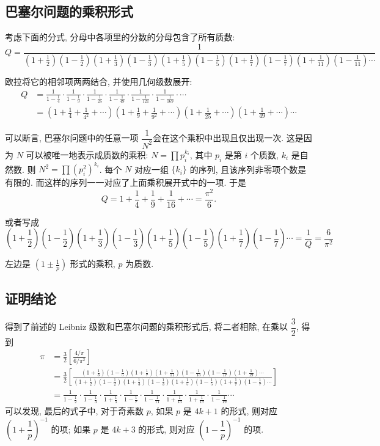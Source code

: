\subsection{巴塞尔问题的乘积形式}
考虑下面的分式, 分母中各项里的分数的分母包含了所有质数:
\[
Q = \frac{1}{(1+\frac{1}{2})(1-\frac{1}{2})(1+\frac{1}{3})(1-\frac{1}{3})(1+\frac{1}{5})(1-\frac{1}{5})(1+\frac{1}{7})(1-\frac{1}{7})(1+\frac{1}{11})(1-\frac{1}{11})\cdots}
\]

欧拉将它的相邻项两两结合, 并使用几何级数展开:
\begin{align*}
Q &= \frac{1}{1-\frac{1}{4}}\cdot\frac{1}{1-\frac{1}{9}}\cdot\frac{1}{1-\frac{1}{25}}\cdot\frac{1}{1-\frac{1}{49}}\cdot\frac{1}{1-\frac{1}{121}}\cdot\frac{1}{1-\frac{1}{169}}\cdot\cdots \\
 &= \left(1+\frac{1}{4}+\frac{1}{4^2}+\cdots\right)\left(1+\frac{1}{9}+\frac{1}{9^2}+\cdots\right)\left(1+\frac{1}{25}+\cdots\right)\left(1+\frac{1}{49}+\cdots\right)\cdots
\end{align*}

可以断言, 巴塞尔问题中的任意一项 $ \dfrac{1}{N^2}$会在这个乘积中出现且仅出现一次. 这是因为 $ N $ 可以被唯一地表示成质数的乘积: $ N = \prod p_i^{k_i} $, 其中 $ p_i $ 是第 $ i $ 个质数, $ k_i $ 是自然数.
则 $ N^2 = \prod (p_i^2)^{k_i} $. 每个 $ N $ 对应一组 $\{k_i\}$ 的序列, 且该序列非零项个数是有限的. 而这样的序列一一对应了上面乘积展开式中的一项. 于是
\[Q = 1 + \frac{1}{4} + \frac{1}{9} + \frac{1}{16} + \cdots = \frac{\pi^2}{6} .\]

或者写成
\[(1+\frac{1}{2})(1-\frac{1}{2})(1+\frac{1}{3})(1-\frac{1}{3})(1+\frac{1}{5})(1-\frac{1}{5})(1+\frac{1}{7})(1-\frac{1}{7})\cdots= \frac{1}{Q} = \frac{6}{\pi^2}\]

左边是 $(1\pm\frac{1}{p})$ 形式的乘积, $p$ 为质数.

\subsection{证明结论}

得到了前述的 Leibniz 级数和巴塞尔问题的乘积形式后, 将二者相除, 在乘以 $ \dfrac{3}{2} $, 得到
\begin{align*}
 \pi &= \frac{3}{2}\left[\frac{4/\pi}{6/\pi^2}\right] \\
&=  \frac{3}{2}\left[\frac{(1+\frac{1}{3})(1-\frac{1}{5})(1+\frac{1}{7})(1+\frac{1}{11})(1-\frac{1}{13})(1-\frac{1}{17})(1+\frac{1}{19})\cdots}{(1+\frac{1}{2})(1-\frac{1}{2})(1+\frac{1}{3})(1-\frac{1}{3})(1+\frac{1}{5})(1-\frac{1}{5})(1+\frac{1}{7})(1-\frac{1}{7})\cdots}\right] \\
&= \frac{1}{1-\frac{1}{2}}\cdot\frac{1}{1-\frac{1}{3}}\cdot\frac{1}{1+\frac{1}{5}}\cdot\frac{1}{1-\frac{1}{7}}\cdot\frac{1}{1-\frac{1}{11}}\cdot\frac{1}{1+\frac{1}{13}}\cdot\frac{1}{1+\frac{1}{17}}\cdot\frac{1}{1-\frac{1}{19}}\cdots
\end{align*}
可以发现, 最后的式子中, 对于奇素数 $ p $, 如果 $p$ 是 $4k+1$ 的形式, 则对应 $\left(1+\dfrac{1}{p}\right)^{-1}$ 的项; 如果 $p$ 是 $4k+3$ 的形式, 则对应 $\left(1-\dfrac{1}{p}\right)^{-1}$ 的项.

